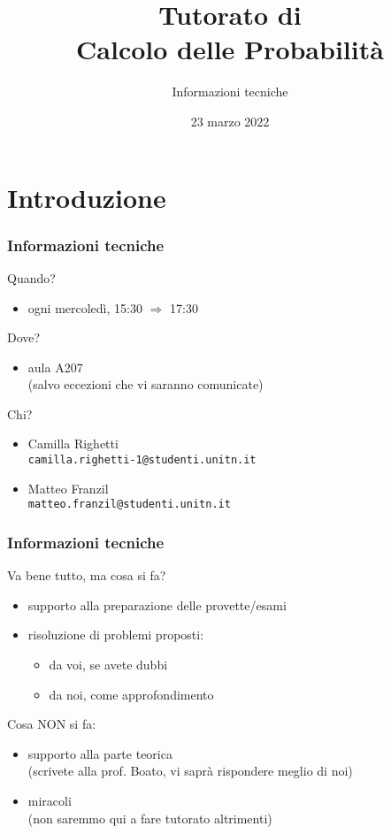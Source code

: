 \documentclass[handout]{beamer}
\title[Tutorato Probabilità]
{Tutorato di\\Calcolo delle Probabilità}
\subtitle{Informazioni tecniche}
\author[DISI]{%
	\texorpdfstring{%
		\begin{columns}
			\column{.50\linewidth}
			\centering
			Camilla Righetti
			\column{.50\linewidth}
			\centering
			Matteo Franzil
		\end{columns}
	}{DISI}
}
\institute[UniTN]{
	\texorpdfstring{%
		\texttt{[image: drawable/logos/logo-disi.png]}
	}{University of Trento}\\
	\smallskip
	Corso di Laurea in Ingegneria Informatica, delle Comunicazioni ed Elettronica
}
\date[23/03/2022]{23 marzo 2022}
\begin{document}
\frame{\titlepage}

\section{Introduzione}

\begin{frame}[fragile]
	\frametitle{Informazioni tecniche}
	
	Quando?
	
	\begin{itemize}
	    \item ogni mercoledì, 15:30 $\Rightarrow$ 17:30
	\end{itemize}
	
	\medskip
	
	Dove?
	
	\begin{itemize}
	    \item aula A207 \\ (salvo eccezioni che vi saranno comunicate)
	\end{itemize}
	
	\medskip
	
	Chi?
	
	\begin{itemize}
	    \item Camilla Righetti \\ \verb=camilla.righetti-1@studenti.unitn.it=
	        
	    \item Matteo Franzil \\ \verb=matteo.franzil@studenti.unitn.it=
	\end{itemize}
	
\end{frame} 

\begin{frame}[fragile]
	\frametitle{Informazioni tecniche}
	
	Va bene tutto, ma cosa si fa?
	
	\begin{itemize}
	    \item supporto alla preparazione delle provette/esami
	    \item risoluzione di problemi proposti: \begin{itemize}
	        \item da voi, se avete dubbi
	        \item da noi, come approfondimento
	    \end{itemize}
	\end{itemize}
	
	\medskip
	
	Cosa NON si fa:
	
	\begin{itemize}
	    \item supporto alla parte teorica\\{ \small (scrivete alla prof. Boato, vi saprà rispondere meglio di noi) }
	    \item miracoli\\{ \small (non saremmo qui a fare tutorato altrimenti) }
	\end{itemize}
    
\end{frame} 
\end{document}
